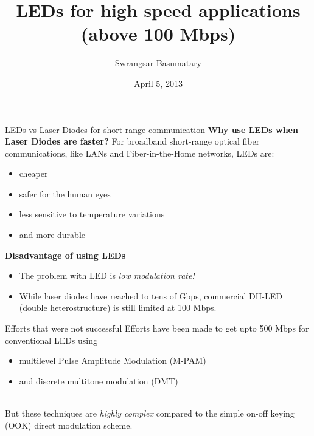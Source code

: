 \documentclass[mathserif]{beamer}
\title{LEDs for high speed applications \\ (above 100 Mbps)}
\author{Swrangsar Basumatary}
\institute{IIT Bombay, Powai}
\date{April 5, 2013}
\begin{document}
    \frame{\titlepage}
    
    \begin{frame}{LEDs vs Laser Diodes for short-range communication}
	    \pause
	    \textbf{Why use LEDs when Laser Diodes are faster?}
            \pause For broadband short-range optical fiber communications, like
LANs and Fiber-in-the-Home networks, LEDs are:
            \pause
            \begin{itemize}[<+->]
                \item cheaper
                \item safer for the human eyes
                \item less sensitive to temperature variations
                \item and more durable
            \end{itemize}
  
        \pause
        \textbf{Disadvantage of using LEDs}
            \begin{itemize}
                \pause \item The problem with LED is \pause \emph{low modulation rate!}\\
                \pause \item While laser diodes have reached to tens of Gbps, \pause 
                commercial DH-LED (double heterostructure) is still limited at 100 Mbps.
            \end{itemize}
        
    \end{frame}
    
    \begin{frame}{Efforts that were not successful}
        \pause
        Efforts have been made to get upto 500 Mbps for conventional LEDs using
        \begin{itemize}
            \pause \item multilevel Pulse Amplitude Modulation (M-PAM)
            \pause \item and discrete multitone modulation (DMT) \\~\\
        \end{itemize} 
        
        \pause But these techniques are \emph{highly complex} compared to the simple on-off keying (OOK) direct modulation scheme.
    \end{frame}
    
    
    
\end{document}

